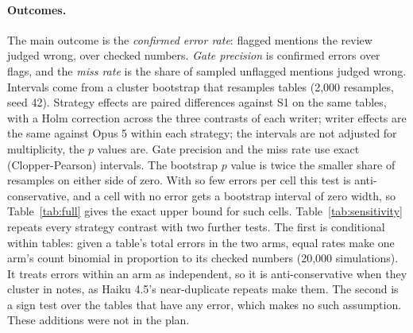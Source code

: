 \documentclass[11pt]{article}
\begin{document}
\paragraph{Outcomes.} The main outcome is the \emph{confirmed error rate}: flagged mentions the review judged wrong, over checked numbers. \emph{Gate precision} is confirmed errors over flags, and the \emph{miss rate} is the share of sampled unflagged mentions judged wrong. Intervals come from a cluster bootstrap that resamples tables (2,000 resamples, seed 42). Strategy effects are paired differences against S1 on the same tables, with a Holm correction across the three contrasts of each writer; writer effects are the same against Opus 5 within each strategy; the intervals are not adjusted for multiplicity, the $p$ values are. Gate precision and the miss rate use exact (Clopper-Pearson) intervals. The bootstrap $p$ value is twice the smaller share of resamples on either side of zero. With so few errors per cell this test is anti-conservative, and a cell with no error gets a bootstrap interval of zero width, so Table~\ref{tab:full} gives the exact upper bound for such cells. Table~\ref{tab:sensitivity} repeats every strategy contrast with two further tests. The first is conditional within tables: given a table's total errors in the two arms, equal rates make one arm's count binomial in proportion to its checked numbers (20,000 simulations). It treats errors within an arm as independent, so it is anti-conservative when they cluster in notes, as Haiku 4.5's near-duplicate repeats make them. The second is a sign test over the tables that have any error, which makes no such assumption. These additions were not in the plan.

\begin{table}[t]
\centering
\caption{Full study, primary set (\FullPrimaryTables{} tables). Strategies: S1 Direct, S2 Compute-then-write, S3 Write-then-verify, S4 Facts-template. Gate flags: mentions the gate flagged, as a percentage of checked numbers. Confirmed: flags the blind review judged wrong. Precision: confirmed errors over flags. Notes with error: notes containing at least one confirmed error. Brackets give 95 percent intervals from resampling tables. * No confirmed error: the bracket gives the exact (Clopper-Pearson) 95 percent upper bound, because the bootstrap interval collapses to zero; bootstrap intervals for cells with one or two errors are also too narrow.}
\label{tab:full}

\end{table}
\end{document}
